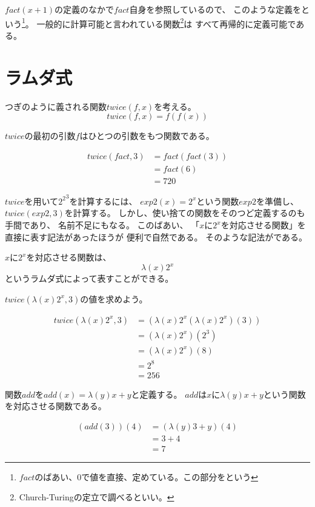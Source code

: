 \documentclass[fleqn]{jsarticle}
\begin{document}
$fact(x+1)$の定義のなかで$fact$自身を参照しているので、
このような定義をという\footnote{$fact$のばあい、$0$で値を直接、定めている。この部分をという}。
一般的に計算可能と言われている関数\footnote{Church-Turingの定立で調べるといい。}は
すべて再帰的に定義可能である。

\section{ラムダ式}

つぎのように義される関数$twice(f,x)$を考える。
\[
  twice(f,x) = f(f(x))
\]

$twice$の最初の引数$f$はひとつの引数をもつ関数である。

\begin{align*}
  twice(fact , 3) &= fact (fact (3))\\
                  &= fact(6)\\
                  &= 720
\end{align*}

$twice$を用いて${2^2}^3$を計算するには、
$exp2(x) = 2^x$という関数$exp2$を準備し、
$twice( exp2 , 3 )$を計算する。
しかし、使い捨ての関数をそのつど定義するのも手間であり、
名前不足にもなる。
このばあい、
「$x$に$2^x$を対応させる関数」を直接に表す記法があったほうが
便利で自然である。
そのような記法がである。

$x$に$2^x$を対応させる関数は、
\[ \lambda (x) 2^x \]
というラムダ式によって表すことができる。

$twice( \lambda (x) 2^x , 3)$の値を求めよう。

\begin{align*}
  twice( \lambda (x) 2^x ,3) &= ( \lambda (x) 2^x ( \lambda (x) 2^x )(3))\\
                           &= ( \lambda (x) 2^x ) (2^3)\\
                           &= ( \lambda (x) 2^x ) (8)\\
                           &= 2^8\\
                           &= 256
\end{align*}

関数$add$を$add (x) = \lambda (y) x+y$と定義する。
$add$は$x$に$\lambda (y) x+y$という関数を対応させる関数である。

\begin{align*}
  (add(3))(4) &= ( \lambda (y) 3 + y)(4)\\
              &= 3 + 4\\
              &= 7
\end{align*}
\end{document}
